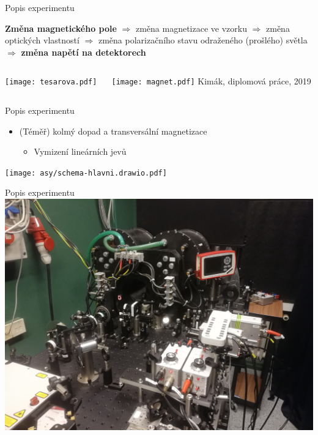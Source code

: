 \documentclass{beamer}
\begin{document}
\begin{frame}{Popis experimentu}
    \begin{block}{}
        \textbf{Změna magnetického pole} $\Rightarrow$ změna magnetizace ve vzorku $\Rightarrow$ změna optických vlastností $\Rightarrow$ změna polarizačního stavu odraženého (prošlého) světla $\Rightarrow$ \textbf{změna napětí na detektorech} \\
    \end{block}
    \begin{columns}
        \begin{column}{0.45\textwidth}
           
    \texttt{[image: tesarova.pdf]}
       \end{column}
       \begin{column}{0.45\textwidth} 

        \texttt{[image: magnet.pdf]}
        Kimák, diplomová práce, 2019
        \end{column}
    \end{columns}
    
\end{frame}


\begin{frame}{Popis experimentu}
    \begin{itemize}
        \item (Téměř) kolmý dopad a transversální magnetizace
        \begin{itemize}
            \item Vymizení lineárních jevů
        \end{itemize}
    \end{itemize}
    \begin{centering}
        \texttt{[image: asy/schema-hlavni.drawio.pdf]}
    \end{centering}
\end{frame}

\begin{frame}{Popis experimentu}
    \includegraphics[width=\textwidth]{exp.jpg}
\end{frame}
\end{document}
